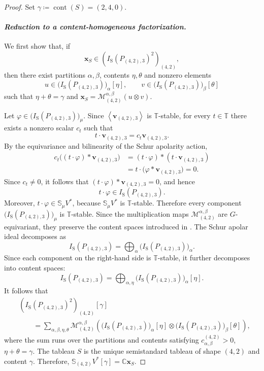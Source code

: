 \documentclass[a4paper,reqno]{amsart}
\theoremstyle{plainnopunct}
\theoremstyle{definitionnopunct}
\newcommand{\C}{\mathbb{C}}
\renewcommand{\S}{\mathbb{S}}
\newcommand{\cM}{\mathcal{M}}
\newcommand{\bx}{\mathbf{x}}
\newcommand{\bv}{\mathbf{v}}
\DeclareMathOperator{\cont}{cont}
\begin{document}
\begin{proof}
Set $\gamma
\coloneq
\cont(S)
=
(2,4,0)$.

\paragraph{\textit{Reduction to a content-homogeneous factorization.}}

We first show that, if
\[
\bx_S
\in
\left(
I_{\mathrm S}(P_{(4,2),3})^2
\right)_{(4,2)},
\]
then there exist partitions $\alpha,\beta$, contents $\eta,\theta$ and nonzero elements
\[
u
\in
\bigl(I_{\mathrm S}(P_{(4,2),3})\bigr)_\alpha[\eta],
\qquad
v
\in
\bigl(I_{\mathrm S}(P_{(4,2),3})\bigr)_\beta[\theta]
\]
such that $\eta+\theta=\gamma$ and $\bx_S
=
\cM^{\alpha,\beta}_{(4,2)}
(u\otimes v)$.

Let $\varphi
\in
\bigl(I_{\mathrm S}(P_{(4,2),3})\bigr)_\mu$.
Since $
\left\langle\bv_{(4,2),3}\right\rangle$ is $\mathbb T$-stable, for every $t\in\mathbb T$ there exists a nonzero scalar $c_t$ such that
\[
t\cdot\bv_{(4,2),3}
=
c_t\bv_{(4,2),3}.
\]
By the equivariance and bilinearity of the Schur apolarity action,
\[
\begin{aligned}
c_t
\bigl(
(t\cdot\varphi)*\bv_{(4,2),3}
\bigr)
&=
(t\cdot\varphi)*
(t\cdot\bv_{(4,2),3})
\\
&=
t\cdot
\bigl(
\varphi*\bv_{(4,2),3}
\bigr)
=
0.
\end{aligned}
\]
Since $c_t\neq0$, it follows that $(t\cdot\varphi)*\bv_{(4,2),3}=0$, and hence
\[
t\cdot\varphi
\in
I_{\mathrm S}(P_{(4,2),3}).
\]
Moreover, $t\cdot\varphi\in\S_\mu V^*$, because $\S_\mu V^*$ is $\mathbb T$-stable. Therefore every component $\bigl(I_{\mathrm S}(P_{(4,2),3})\bigr)_\mu$ is $\mathbb T$-stable. Since the multiplication maps $\cM^{\alpha,\beta}_{(4,2)}$ are $G$-equivariant, they preserve the content spaces introduced in . The Schur apolar ideal decomposes as
\[
I_{\mathrm S}(P_{(4,2),3})
=
\bigoplus_\alpha
\bigl(I_{\mathrm S}(P_{(4,2),3})\bigr)_\alpha.
\]
Since each component on the right-hand side is $\mathbb T$-stable, it further decomposes into content spaces:
\[
I_{\mathrm S}(P_{(4,2),3})
=
\bigoplus_{\alpha,\eta}
\bigl(I_{\mathrm S}(P_{(4,2),3})\bigr)_\alpha[\eta].
\]
It follows that
\begin{equation}
\label{eq: content decomposition schur square}
\begin{aligned}
&
\left(
I_{\mathrm S}(P_{(4,2),3})^2
\right)_{(4,2)}[\gamma]
\\
&\qquad =
\sum_{\alpha,\beta,\eta,\theta}
\cM^{\alpha,\beta}_{(4,2)}
\left(
\bigl(I_{\mathrm S}(P_{(4,2),3})\bigr)_\alpha[\eta]
\otimes
\bigl(I_{\mathrm S}(P_{(4,2),3})\bigr)_\beta[\theta]
\right),
\end{aligned}
\end{equation}
where the sum runs over the partitions and contents satisfying $c_{\alpha,\beta}^{(4,2)}>0$,  $\eta+\theta=\gamma$. The tableau $S$ is the unique semistandard tableau of shape $(4,2)$ and content $\gamma$. Therefore, $\S_{(4,2)}V^*[\gamma] = \C\bx_S$.


\end{proof}
\end{document}
